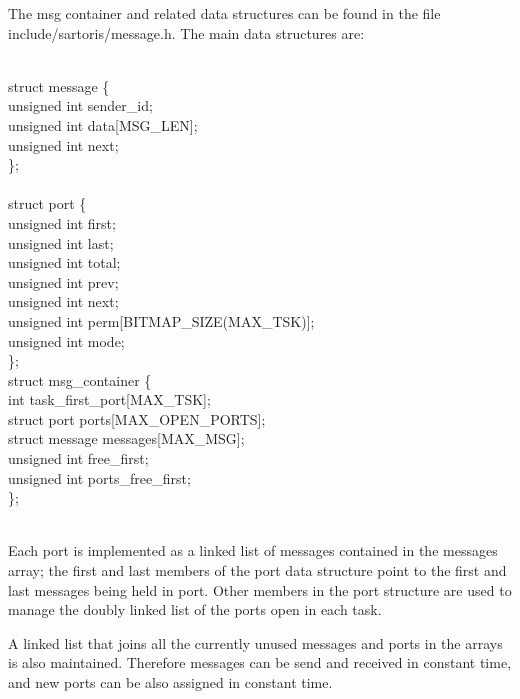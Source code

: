 \documentclass[11pt, letterpaper, twoside, english]{book}
\begin{document}
The msg container and related data structures can be found in the file \textsf{include/sartoris/message.h}. The main data structures are: \\
\\ 
\begin{sf} \noindent struct message \{ \\
\indent  unsigned int sender\_id; \\
\indent  unsigned int data[MSG\_LEN]; \\
\indent  unsigned int next; \\
\}; \\
\\
struct port \{ \\
\indent  unsigned int first; \\
\indent  unsigned int last; \\				
\indent  unsigned int total; \\				
\indent  unsigned int prev; \\				
\indent  unsigned int next; \\				
\indent  unsigned int perm[BITMAP\_SIZE(MAX\_TSK)]; \\		
\indent  unsigned int mode; \\				
\};\\

struct msg\_container \{\\
\indent  int task\_first\_port[MAX\_TSK]; \\	
\indent  struct port ports[MAX\_OPEN\_PORTS]; \\			
\indent  struct message messages[MAX\_MSG]; \\		
\indent  unsigned int free\_first;\\
\indent  unsigned int ports\_free\_first;\\
\};\\
\end{sf}
\\
Each port is implemented as a linked list of messages contained in the \textsf{messages} array; the \textsf{first} and \textsf{last} members of the \textsf{port} data structure point to the first and last messages being held in \textsf{port}. Other members in the port structure are used to manage the doubly linked list of the ports open in each task.

A linked list that joins all the currently unused messages and ports in the arrays is also maintained. Therefore messages can be send and received in constant time, and new ports can be also assigned in constant time.
\end{document}
